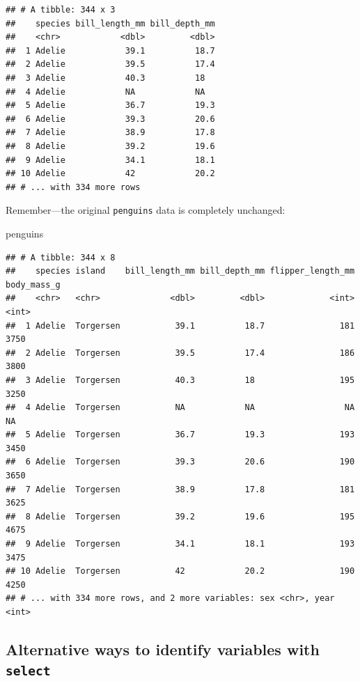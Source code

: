 \documentclass[
]{book}
\newenvironment{Shaded}{\begin{snugshade}}{\end{snugshade}}
\newcommand{\NormalTok}[1]{#1}
\begin{document}
\begin{verbatim}
## # A tibble: 344 x 3
##    species bill_length_mm bill_depth_mm
##    <chr>            <dbl>         <dbl>
##  1 Adelie            39.1          18.7
##  2 Adelie            39.5          17.4
##  3 Adelie            40.3          18  
##  4 Adelie            NA            NA  
##  5 Adelie            36.7          19.3
##  6 Adelie            39.3          20.6
##  7 Adelie            38.9          17.8
##  8 Adelie            39.2          19.6
##  9 Adelie            34.1          18.1
## 10 Adelie            42            20.2
## # ... with 334 more rows
\end{verbatim}

Remember---the original \texttt{penguins} data is completely unchanged:

\begin{Shaded}
\begin{Highlighting}[]
\NormalTok{penguins}
\end{Highlighting}
\end{Shaded}

\begin{verbatim}
## # A tibble: 344 x 8
##    species island    bill_length_mm bill_depth_mm flipper_length_mm body_mass_g
##    <chr>   <chr>              <dbl>         <dbl>             <int>       <int>
##  1 Adelie  Torgersen           39.1          18.7               181        3750
##  2 Adelie  Torgersen           39.5          17.4               186        3800
##  3 Adelie  Torgersen           40.3          18                 195        3250
##  4 Adelie  Torgersen           NA            NA                  NA          NA
##  5 Adelie  Torgersen           36.7          19.3               193        3450
##  6 Adelie  Torgersen           39.3          20.6               190        3650
##  7 Adelie  Torgersen           38.9          17.8               181        3625
##  8 Adelie  Torgersen           39.2          19.6               195        4675
##  9 Adelie  Torgersen           34.1          18.1               193        3475
## 10 Adelie  Torgersen           42            20.2               190        4250
## # ... with 334 more rows, and 2 more variables: sex <chr>, year <int>
\end{verbatim}

\hypertarget{alternative-ways-to-identify-variables-with-select}{%
\subsection{\texorpdfstring{Alternative ways to identify variables with \texttt{select}}{Alternative ways to identify variables with select}}\label{alternative-ways-to-identify-variables-with-select}}
\end{document}
